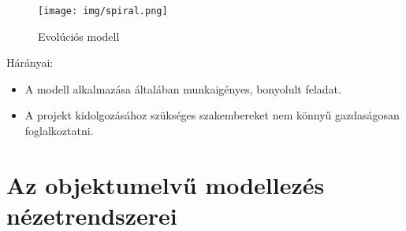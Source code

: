 \documentclass[margin=0px]{article}
\begin{document}
\begin{enumerate}
				\begin{figure}[H]
					\centering
					\texttt{[image: img/spiral.png]}
					\caption{Evolúciós modell}
					\label{fig:spiral}
				\end{figure}
				
				Hárányai: 
				\begin{itemize}
					\item A modell alkalmazása általában munkaigényes, bonyolult feladat.
					\item A projekt kidolgozásához szükséges szakembereket nem könnyű
					gazdaságosan foglalkoztatni.
				\end{itemize}
		\end{enumerate}
		
	\section{Az objektumelvű modellezés nézetrendszerei}
	
\end{document}
